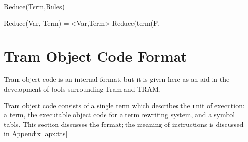 \documentclass[11pt,twoside]{memoir}
\newcommand{\D}[1]{\index{#1}\defn{#1}}
\def\T{\texttt}
\begin{document}
Reduce(Term,Rules)

Reduce(Var, Term) = {<Var,Term>}
Reduce(term(F,
-- 














\chapter{Tram Object Code Format}
\label{apx:tocf}

Tram object code is an internal format, but it is given here as an aid in the development of tools surrounding Tram and TRAM.

Tram object code consists of a single term which describes the unit of execution: a term, the executable object code for a term rewriting system, and a symbol table. This section discusses the format; the meaning of instructions is discussed in Appendix \ref{apx:tts}
\end{document}
